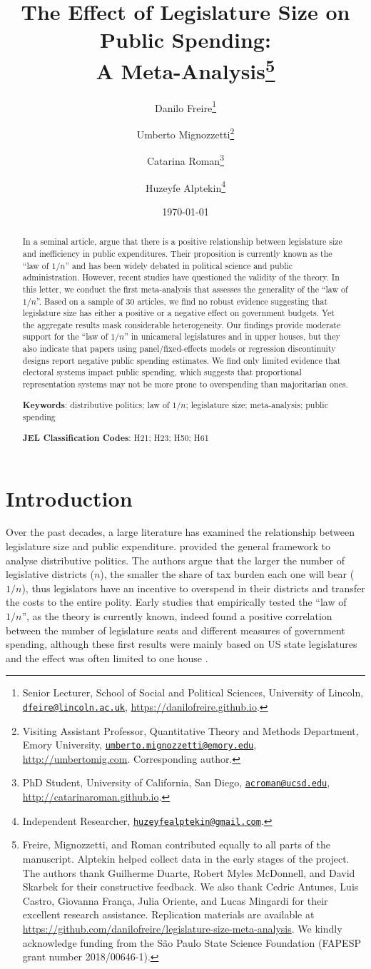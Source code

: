 \documentclass[11pt,a4paper,]{article}
\title{The Effect of Legislature Size on Public Spending:\\
A Meta-Analysis\thanks{Freire, Mignozzetti, and Roman contributed
equally to all parts of the manuscript. Alptekin helped collect data in
the early stages of the project. The authors thank Guilherme Duarte,
Robert Myles McDonnell, and David Skarbek for their constructive
feedback. We also thank Cedric Antunes, Luis Castro, Giovanna França,
Julia Oriente, and Lucas Mingardi for their excellent research
assistance. Replication materials are available at
\url{https://github.com/danilofreire/legislature-size-meta-analysis}. We
kindly acknowledge funding from the São Paulo State Science Foundation
(FAPESP grant number 2018/00646-1).}}
\author{Danilo Freire\footnote{Senior Lecturer, School of Social and
  Political Sciences, University of Lincoln,
  \href{mailto:dfeire@lincoln.ac.uk}{\nolinkurl{dfeire@lincoln.ac.uk}},
  \url{https://danilofreire.github.io}.} \and Umberto
Mignozzetti\footnote{Visiting Assistant Professor, Quantitative Theory
  and Methods Department, Emory University,
  \href{mailto:umberto.mignozzetti@emory.edu}{\nolinkurl{umberto.mignozzetti@emory.edu}},
  \url{http://umbertomig.com}. Corresponding author.} \and Catarina
Roman\footnote{PhD Student, University of California, San Diego,
  \href{mailto:acroman@ucsd.edu}{\nolinkurl{acroman@ucsd.edu}},
  \url{http://catarinaroman.github.io}.} \and Huzeyfe
Alptekin\footnote{Independent Researcher,
  \href{mailto:huzeyfealptekin@gmail.com}{\nolinkurl{huzeyfealptekin@gmail.com}}.}}
\date{\today}
\begin{document}
\maketitle

\begin{abstract}
\doublespacing \noindent In a seminal article,
\citet{weingast1981political} argue that there is a positive
relationship between legislature size and inefficiency in public
expenditures. Their proposition is currently known as the ``law of
\(1/n\)'' and has been widely debated in political science and public
administration. However, recent studies have questioned the validity of
the theory. In this letter, we conduct the first meta-analysis that
assesses the generality of the ``law of \(1/n\)''. Based on a sample of
30 articles, we find no robust evidence suggesting that legislature size
has either a positive or a negative effect on government budgets. Yet
the aggregate results mask considerable heterogeneity. Our findings
provide moderate support for the ``law of \(1/n\)'' in unicameral
legislatures and in upper houses, but they also indicate that papers
using panel/fixed-effects models or regression discontinuity designs
report negative public spending estimates. We find only limited evidence
that electoral systems impact public spending, which suggests that
proportional representation systems may not be more prone to
overspending than majoritarian ones.
\vspace{.25cm}

\noindent \textbf{Keywords}: distributive politics; law of \(1/n\);
legislature size; meta-analysis; public spending
\vspace{.25cm}

\noindent \textbf{JEL Classification Codes}: H21; H23; H50; H61
\end{abstract}


\newpage

\hypertarget{introduction}{%
\section{Introduction}\label{introduction}}

\label{sec:intro}

Over the past decades, a large literature has examined the relationship
between legislature size and public expenditure.
\citet{weingast1981political} provided the general framework to analyse
distributive politics. The authors argue that the larger the number of
legislative districts (\(n\)), the smaller the share of tax burden each
one will bear (\(1/n\)), thus legislators have an incentive to overspend
in their districts and transfer the costs to the entire polity. Early
studies that empirically tested the ``law of \(1/n\)'', as the theory is
currently known, indeed found a positive correlation between the number
of legislature seats and different measures of government spending,
although these first results were mainly based on US state legislatures
and the effect was often limited to one house
\citep[e.g.,][]{baqir2002districting, gilligan1995deviations, gilligan2001fiscal}.
\end{document}
